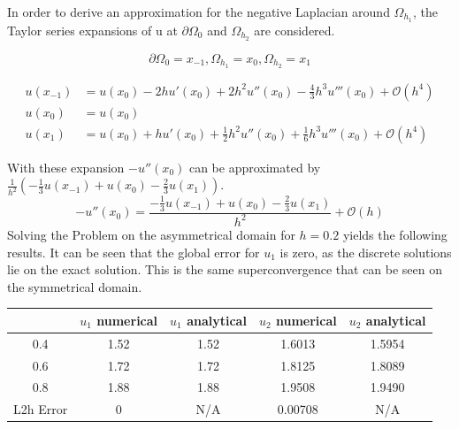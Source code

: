 \documentclass{article}
\begin{document}
In order to derive an approximation for the negative Laplacian around $\Omega_{h_1}$, the Taylor series expansions of u at $\partial \Omega_0$ and $\Omega_{h_2}$ are considered.

\begin{equation}
	\partial \Omega_0 = x_{-1},  \Omega_{h_1} = x_0, \Omega_{h_2} = x_1
\end{equation}

\begin{align}
	u(x_{-1}) &= u(x_0) - 2h u'(x_0) + 2h^2u''(x_0)-\frac{4}{3}h^3u'''(x_0) +\mathcal{O}(h^4)\\
	u(x_{0}) &= u(x_0)\\
	u(x_{1}) &= u(x_0) +h u'(x_0) + \frac{1}{2}h^2u''(x_0)+\frac{1}{6}h^3u'''(x_0)+\mathcal{O}(h^4)
\end{align}

With these expansion $-u''(x_{0})$ can be approximated by $\frac{1}{h^2}(-\frac{1}{3}u(x_{-1})+u(x_{0})-\frac{2}{3}u(x_{1}))$. 
\begin{equation}
-u''(x_{0})=\frac{-\frac{1}{3} u(x_{-1}) + u(x_{0}) - \frac{2}{3} u(x_{1})}{h^2}+\mathcal{O}(h)
\end{equation}
Solving the Problem on the asymmetrical domain for $h=0.2$ yields the following results. It can be seen that the global error for $u_1$ is zero, as the discrete solutions lie on the exact solution. This is the same superconvergence that can be seen on the symmetrical domain.
\begin{table}[H]
    \centering
    \begin{tabular}{c|c|c|c|c}
            & $u_1$ numerical & $u_1$ analytical & $u_2$ numerical & $u_2$ analytical \\ \hline
        0.4 & 1.52 & 1.52 & 1.6013 & 1.5954 \\ \hline
        0.6 & 1.72 & 1.72 & 1.8125 & 1.8089 \\ \hline
        0.8 & 1.88 & 1.88 & 1.9508 & 1.9490 \\ \hline
        L2h Error& $0$ & N/A &0.00708 & N/A
    \end{tabular}
\end{table}
\end{document}
